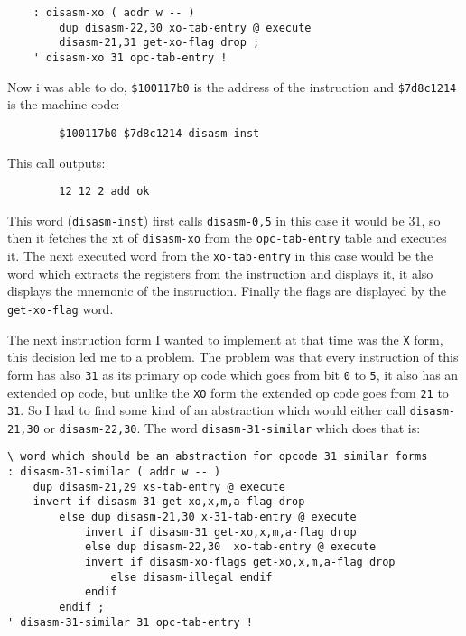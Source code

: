     \begin{verbatim}
    : disasm-xo ( addr w -- )
        dup disasm-22,30 xo-tab-entry @ execute
        disasm-21,31 get-xo-flag drop ;
    ' disasm-xo 31 opc-tab-entry !
    \end{verbatim}

    Now i was able to do, \texttt{\$100117b0} is the address of the instruction
    and \texttt{\$7d8c1214} is the machine code:

    \begin{verbatim}
        $100117b0 $7d8c1214 disasm-inst
    \end{verbatim}

    This call outputs:

    \begin{verbatim}
        12 12 2 add ok
    \end{verbatim}

    This word (\texttt{disasm-inst}) first calls \texttt{disasm-0,5} in this 
    case it would be 31, so then it fetches the xt of \texttt{disasm-xo} from 
    the \texttt{opc-tab-entry} table and executes it. The next executed word
    from the \texttt{xo-tab-entry} in this case would be the word which
    extracts the registers from the instruction and displays it, it also
    displays the mnemonic of the instruction. Finally the flags are displayed
    by the \texttt{get-xo-flag} word.

    The next instruction form I wanted to implement at that time was the
    \texttt{X} form, this decision led me to a problem. The problem was that
    every instruction of this form has also \texttt{31} as its primary op code 
    which goes from bit \texttt{0} to \texttt{5}, it also has an extended 
    op code, but unlike the \texttt{XO} form the extended op code goes 
    from \texttt{21} to \texttt{31}. So I had to find some kind of an 
    abstraction which would either call \texttt{disasm-21,30} or 
    \texttt{disasm-22,30}. The word \texttt{disasm-31-similar} which does that 
    is:

    \pagebreak
    \begin{verbatim}
\ word which should be an abstraction for opcode 31 similar forms
: disasm-31-similar ( addr w -- )
    dup disasm-21,29 xs-tab-entry @ execute
    invert if disasm-31 get-xo,x,m,a-flag drop
        else dup disasm-21,30 x-31-tab-entry @ execute
            invert if disasm-31 get-xo,x,m,a-flag drop
            else dup disasm-22,30  xo-tab-entry @ execute
            invert if disasm-xo-flags get-xo,x,m,a-flag drop
                else disasm-illegal endif
            endif
        endif ;
' disasm-31-similar 31 opc-tab-entry !
    \end{verbatim}

